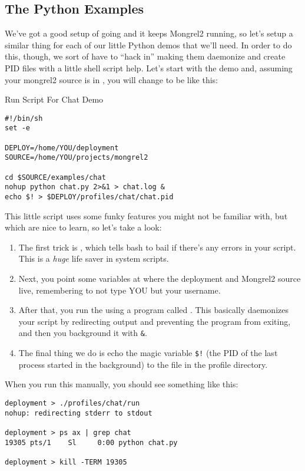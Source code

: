 \subsection{The Python Examples}

We've got a good setup of  going and it keeps Mongrel2
running, so let's setup a similar thing for each of our little
Python demos that we'll need.  In order to do this, though, we sort
of have to ``hack in'' making them daemonize and create PID files with
a little shell script help.  Let's start with the  demo
and, assuming your mongrel2 source is in ,
you will change  to be like this:

\begin{code}{Run Script For Chat Demo}
\begin{Verbatim}
#!/bin/sh
set -e

DEPLOY=/home/YOU/deployment
SOURCE=/home/YOU/projects/mongrel2

cd $SOURCE/examples/chat
nohup python chat.py 2>&1 > chat.log &
echo $! > $DEPLOY/profiles/chat/chat.pid
\end{Verbatim}
\end{code}

This little script uses some funky features you might not be familiar
with, but which are nice to learn, so let's take a look:


\begin{enumerate}
\item The first trick is , which tells bash to bail if there's
    any errors in your script.  This is a \emph{huge} life saver in system
    scripts.
\item Next, you point some variables at where the deployment and Mongrel2 source
    live, remembering to not type YOU but your username.
\item After that, you run the  using a program called .
    This basically daemonizes your script by redirecting output and
    preventing the program from exiting, and then you background it with \verb|&|.
\item The final thing we do is echo the magic variable \verb|$!| (the PID of the
  last process started in the background) to the  file in the
  profile directory.
\end{enumerate}

When you run this manually, you should see something like this:

\begin{Verbatim}
deployment > ./profiles/chat/run
nohup: redirecting stderr to stdout

deployment > ps ax | grep chat
19305 pts/1    Sl     0:00 python chat.py

deployment > kill -TERM 19305
\end{Verbatim}

